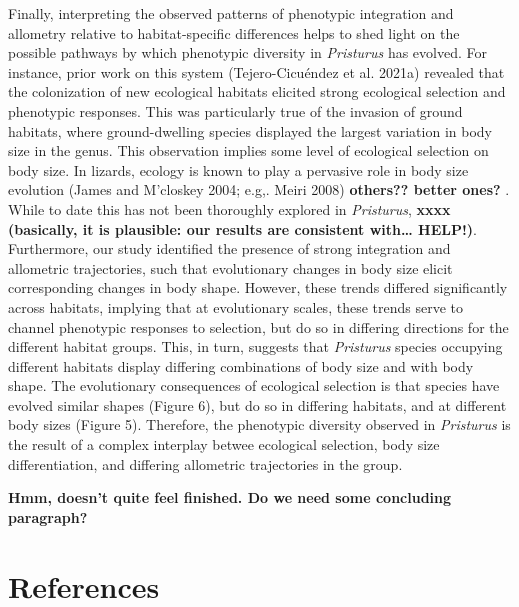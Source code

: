 \documentclass[
  11pt,
]{article}
\begin{document}
Finally, interpreting the observed patterns of phenotypic integration
and allometry relative to habitat-specific differences helps to shed
light on the possible pathways by which phenotypic diversity in
\emph{Pristurus} has evolved. For instance, prior work on this system
(Tejero-Cicuéndez et al. 2021a) revealed that the colonization of new
ecological habitats elicited strong ecological selection and phenotypic
responses. This was particularly true of the invasion of ground
habitats, where ground-dwelling species displayed the largest variation
in body size in the genus. This observation implies some level of
ecological selection on body size. In lizards, ecology is known to play
a pervasive role in body size evolution (James and M'closkey 2004; e.g,.
Meiri 2008) \textbf{others?? better ones? }. While to date this has not
been thoroughly explored in \emph{Pristurus}, \textbf{xxxx (basically,
it is plausible: our results are consistent with\ldots{} HELP!)}.
Furthermore, our study identified the presence of strong integration and
allometric trajectories, such that evolutionary changes in body size
elicit corresponding changes in body shape. However, these trends
differed significantly across habitats, implying that at evolutionary
scales, these trends serve to channel phenotypic responses to selection,
but do so in differing directions for the different habitat groups.
This, in turn, suggests that \emph{Pristurus} species occupying
different habitats display differing combinations of body size and with
body shape. The evolutionary consequences of ecological selection is
that species have evolved similar shapes (Figure 6), but do so in
differing habitats, and at different body sizes (Figure 5). Therefore,
the phenotypic diversity observed in \emph{Pristurus} is the result of a
complex interplay betwee ecological selection, body size
differentiation, and differing allometric trajectories in the group.

\textbf{Hmm, doesn't quite feel finished. Do we need some concluding
paragraph?}

\newpage

\hypertarget{references}{%
\section*{References}\label{references}}

\setlength{\parindent}{-0.25in} \setlength{\leftskip}{0.25in}
\setlength{\parskip}{8pt} \noindent
\end{document}

